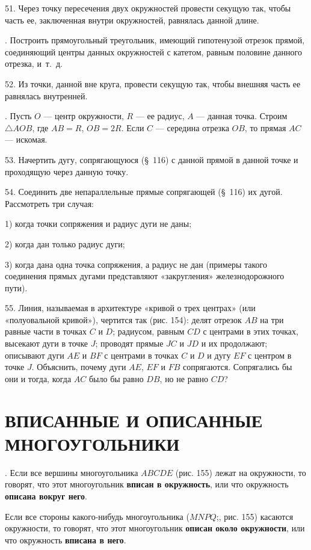 \documentclass[oneside]{book}
\begin{document}
51.
Через точку пересечения двух окружностей провести секущую так, чтобы часть ее, заключенная внутри окружностей, равнялась данной длине.

.
Построить прямоугольный треугольник, имеющий гипотенузой отрезок прямой, соединяющий центры данных окружностей с катетом, равным половине данного отрезка, и~т.~д.

52.
Из точки, данной вне круга, провести секущую так, чтобы внешняя часть ее равнялась внутренней.

.
Пусть $O$ — центр окружности, $R$ — ее радиус, $A$ — данная точка.
Строим $\triangle AOB$, где $AB=R$, $OB=2R$.
Если $C$ — середина отрезка $OB$, то прямая $AC$ — искомая.

53.
Начертить дугу, сопрягающуюся (§~116) с данной прямой в данной точке и проходящую через данную точку.

54.
Соединить две непараллельные прямые сопрягающей (§~116) их дугой.
Рассмотреть три случая:

1) когда точки сопряжения и радиус дуги не даны;

2) когда дан только радиус дуги;

3) когда дана одна точка сопряжения, а радиус не дан (примеры такого соединения прямых дугами представляют «закругления» железнодорожного пути).

55.
Линия, называемая в архитектуре «кривой о трех центрах» (или «полуовальной кривой»), чертится так (рис. 154):
делят отрезок $AB$ на три равные части в точках $C$ и $D$;
радиусом, равным $CD$ с центрами в этих точках, высекают дуги в точке $J$;
проводят прямые $JC$ и $JD$ и их продолжают;
описывают дуги $AE$ и $BF$ с центрами в точках $C$ и $D$ и дугу $EF$ с центром в точке $J$.
Объяснить, почему дуги $AE$, $EF$ и $FB$ сопрягаются.
Сопрягались бы они и тогда, когда $AC$ было бы равно $DB$, но не равно $CD$?

\section{ВПИСАННЫЕ И ОПИСАННЫЕ МНОГОУГОЛЬНИКИ}

.
Если все вершины многоугольника $ABCDE$ (рис. 155) лежат на окружности, то говорят, что этот многоугольник \textbf{вписан в окружность}, или что окружность \textbf{описана вокруг него}.

Если все стороны какого-нибудь многоугольника ($MNPQ$;, рис. 155) касаются окружности, то говорят, что этот многоугольник \textbf{описан около окружности}, или что окружность \textbf{вписана в него}.
\end{document}

